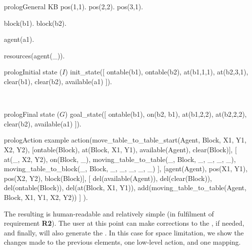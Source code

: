 \begin{center}
\begin{minipage}{\linewidth}
    \begin{minipage}{.48\linewidth}
        \begin{codebox}{prolog}{General KB}
pos(1,1).
pos(2,2).
pos(3,1).

block(b1).
block(b2).

agent(a1).

resources(agent(_)).
        \end{codebox}
    \end{minipage}
    \hfill
    \begin{minipage}{.48\linewidth}
        \begin{minipage}{\linewidth}
        \begin{codebox}{prolog}{Initial state ($I$)}
init_state([
  ontable(b1), ontable(b2),
  at(b1,1,1), at(b2,3,1),
  clear(b1), clear(b2),
  available(a1)
]).
        \end{codebox}
        \end{minipage}
        \hspace{1cm}\\
        \begin{minipage}{\linewidth}
        \begin{codebox}{prolog}{Final state ($G$)}
goal_state([
  ontable(b1),
  on(b2, b1),
  at(b1,2,2), at(b2,2,2),
  clear(b2),
  available(a1)
]).
        \end{codebox}
        \end{minipage}
    \end{minipage}
\end{minipage}
\begin{codebox}{prolog}{Action example}
action(move_table_to_table_start(Agent, Block, X1, Y1, X2, Y2), 
  [ontable(Block), at(Block, X1, Y1), available(Agent), clear(Block)],
  [
    at(_, X2, Y2), on(Block, _), moving_table_to_table(_, Block, _, _, _, _), 
    moving_table_to_block(_, Block, _, _, _, _, _)
  ],
  [agent(Agent), pos(X1, Y1), pos(X2, Y2), block(Block)],
  [
    del(available(Agent)), del(clear(Block)), del(ontable(Block)), del(at(Block, X1, Y1)),
    add(moving_table_to_table(Agent, Block, X1, Y1, X2, Y2))
  ]
).
\end{codebox}
\end{center}

The resulting \HL \kb is human-readable and relatively simple (in fulfilment of requirement \textbf{R2}).
The user at this point can make corrections to the \HL \kb, if needed, and finally, \frameworkname will also generate the \LL \kbase. In this case for space limitation, we show the changes made to the previous elements, one low-level action, and one mapping. 

